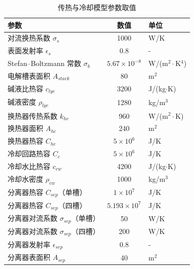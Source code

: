 \begin{table}[!htbp]
  \centering
  \caption{传热与冷却模型参数取值}
  \label{tab:params_thermal}
  \small
  \begin{tabular}{@{}l c l@{}}
    \toprule
    \textbf{参数} & \textbf{数值} & \textbf{单位} \\
    \midrule
    对流换热系数 $\sigma_s$ & 1000 & W/K \\
    表面发射率 $\epsilon_s$ & 0.8 & - \\
    Stefan--Boltzmann 常数 $\sigma_b$ & $5.67 \times 10^{-8}$ & W/($\mathrm{m}^2\cdot$K$^4$) \\
    电解槽表面积 $A_{stack}$ & 80 & $\mathrm{m}^2$ \\
    \addlinespace
    碱液比热容 $c_{lye}$ & 3200 & J/(kg$\cdot$K) \\
    碱液密度 $\rho_{lye}$ & 1280 & kg/$\mathrm{m}^3$ \\
    \addlinespace
    换热器传热系数 $k_{he}$ & 960 & W/($\mathrm{m}^2\cdot$K) \\
    换热器面积 $A_{he}$ & 240 & $\mathrm{m}^2$ \\
    换热器热容 $C_{he}$ & $5 \times 10^{6}$ & J/K \\
    冷却回路热容 $C_c$ & $5 \times 10^{6}$ & J/K \\
    冷却水比热容 $c_{cw}$ & 4200 & J/(kg$\cdot$K) \\
    冷却水密度 $\rho_{cw}$ & 1000 & kg/$\mathrm{m}^3$ \\
    \addlinespace
    分离器热容 $C_{sep}$（单槽） & $1 \times 10^{7}$ & J/K \\
    分离器热容 $C_{sep}$（四槽） & $5.193 \times 10^{7}$ & J/K \\
    分离器对流系数 $\sigma_{sep}$（单槽） & 50 & W/K \\
    分离器对流系数 $\sigma_{sep}$（四槽） & 200 & W/K \\
    分离器发射率 $\epsilon_{sep}$ & 0.8 & - \\
    分离器表面积 $A_{sep}$ & 40 & $\mathrm{m}^2$ \\
    \bottomrule
  \end{tabular}
\end{table}


